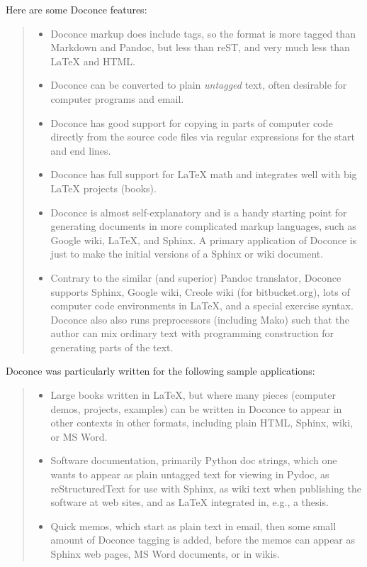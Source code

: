 \documentclass[a4paper]{article}
\begin{document}
Here are some Doconce features:
%
\begin{quote}
%
\begin{itemize}

\item Doconce markup does include tags, so the format is more tagged than
Markdown and Pandoc, but less than reST, and very much less than
LaTeX and HTML.

\item Doconce can be converted to plain \emph{untagged} text,
often desirable for computer programs and email.

\item Doconce has good support for copying in parts of computer code
directly from the source code files via regular expressions
for the start and end lines.

\item Doconce has full support for LaTeX math and integrates well
with big LaTeX projects (books).

\item Doconce is almost self-explanatory and is a handy starting point
for generating documents in more complicated markup languages, such
as Google wiki, LaTeX, and Sphinx. A primary application of Doconce
is just to make the initial versions of a Sphinx or wiki document.

\item Contrary to the similar (and superior) Pandoc translator, Doconce
supports Sphinx, Google wiki, Creole wiki (for bitbucket.org),
lots of computer code environments in LaTeX, and a special exercise
syntax. Doconce also also runs preprocessors (including Mako)
such that the author can mix ordinary text with programming
construction for generating parts of the text.

\end{itemize}

\end{quote}

Doconce was particularly written for the following sample applications:
%
\begin{quote}
%
\begin{itemize}

\item Large books written in LaTeX, but where many pieces (computer demos,
projects, examples) can be written in Doconce to appear in other
contexts in other formats, including plain HTML, Sphinx, wiki, or MS Word.

\item Software documentation, primarily Python doc strings, which one wants
to appear as plain untagged text for viewing in Pydoc, as reStructuredText
for use with Sphinx, as wiki text when publishing the software at
web sites, and as LaTeX integrated in, e.g., a thesis.

\item Quick memos, which start as plain text in email, then some small
amount of Doconce tagging is added, before the memos can appear as
Sphinx web pages, MS Word documents, or in wikis.

\end{itemize}

\end{quote}
\end{document}
